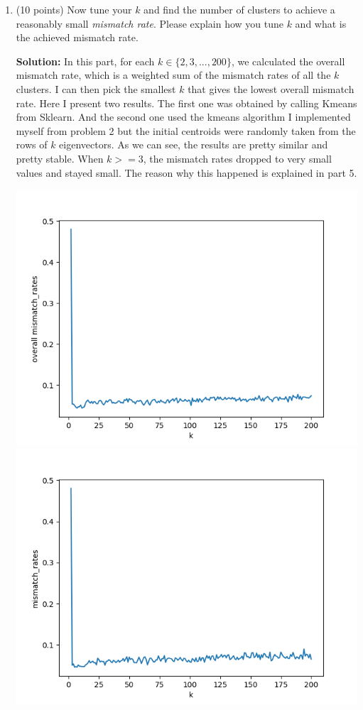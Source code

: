 \documentclass[twoside,10pt]{article}
\begin{document}
\begin{enumerate}
\item (10 points) Now tune your $k$ and find the number of clusters to achieve a reasonably small {\it mismatch rate}. Please explain how you tune $k$ and what is the achieved mismatch rate.  
\begin{tcolorbox}
\textbf{Solution:} In this part, for each $k \in \{2,3,...,200\}$, we calculated the overall mismatch rate, which is a weighted sum of the mismatch rates of all the $k$ clusters. I can then pick the smallest $k$ that gives the lowest overall mismatch rate. Here I present two results. The first one was obtained by calling Kmeans from Sklearn. And the second one used the kmeans algorithm I implemented myself from problem 2 but the initial centroids were randomly taken from the rows of $k$ eigenvectors. As we can see, the results are pretty similar and pretty stable. When $k>=3$, the mismatch rates dropped to very small values and stayed small. The reason why this happened is explained in part 5.
\begin{center}
    \includegraphics[scale = .4]{homework1/spectral1.png}
    \includegraphics[scale = .4]{spectral2.png}
\end{center}


\end{tcolorbox}
\end{enumerate}
\end{document}

